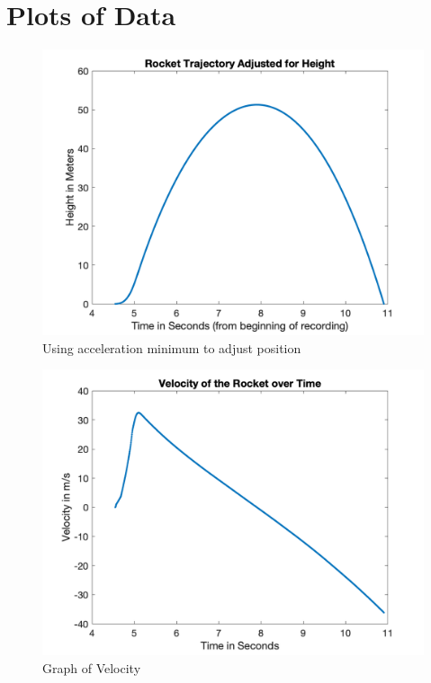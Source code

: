 \documentclass[a4paper,11pt]{article}
\begin{document}
\section{Plots of Data}
\begin{figure}[H]
    \begin{center}
    \includegraphics[width=\linewidth/3]{rockettraj.png}
    \end{center}
    \caption{Using acceleration minimum to adjust position}
    \label{fig:Rocket Trajectory}
\end{figure}
\begin{figure}[H]
    \begin{center}
    \includegraphics[width=\linewidth/3]{vel.png}
    \end{center}
    \caption{Graph of Velocity}
    \label{fig:Velocity}
\end{figure}
\end{document}
